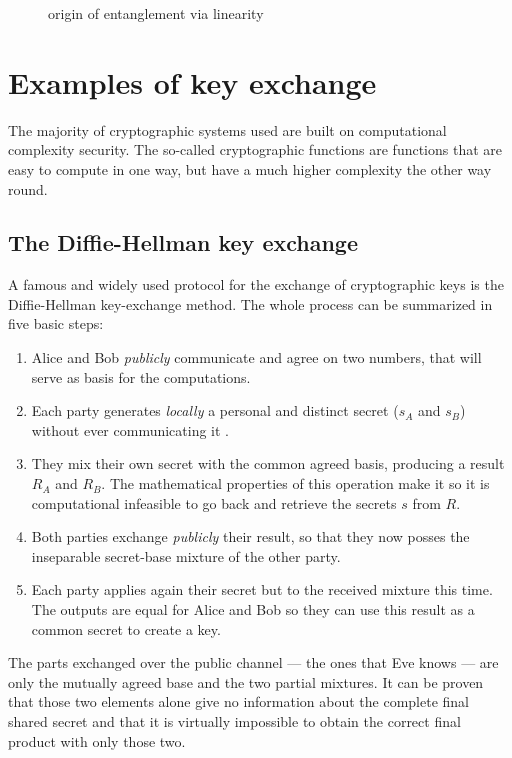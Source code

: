    	 \begin{figure}[h]
			\centering
			
			\caption{origin of entanglement via linearity}
		\end{figure}
		
\section{Examples of key exchange}
	The majority of cryptographic systems used are built on computational complexity security. The so-called cryptographic functions are functions that are easy to compute in one way, but have a much higher complexity the other way round.
		\subsection{The Diffie-Hellman key exchange}
	
		A famous and widely used protocol for the exchange of cryptographic keys is the Diffie-Hellman key-exchange method.
	The whole process can be summarized in five basic steps:
	\begin{enumerate}
		\item Alice and Bob \emph{publicly} communicate and agree on two numbers, that will serve as basis for the computations.
		\item Each party generates \emph{locally} a personal and distinct secret ($s_A$ and $s_B$) without ever communicating it .
		\item They mix their own secret with the common agreed basis, producing a result $R_A$ and $R_B$. The mathematical properties of this operation make it so it is computational infeasible to go back and retrieve the secrets $s$ from $R$.
		\item Both parties exchange \emph{publicly} their result, so that they now posses the inseparable secret-base mixture of the other party.
		\item Each party applies again their secret but to the received mixture this time. The outputs are equal for Alice and Bob so they can use this result as a common secret to create a key.
	\end{enumerate}	 
	The parts exchanged over the public channel --- the ones that Eve knows --- are only the mutually agreed base and the two partial mixtures. 
	It can be proven that those two elements alone give no information about the complete final shared secret and that it is virtually impossible to obtain the correct final product with only those two.\\  
	
